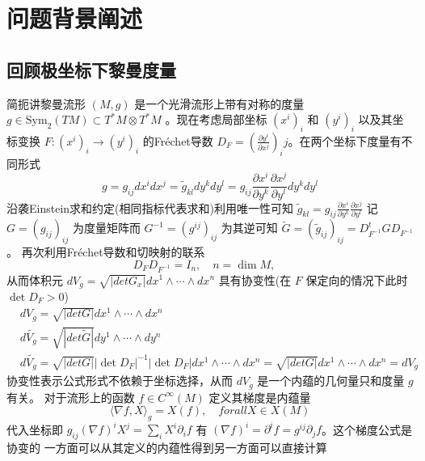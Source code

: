 \section{问题背景阐述}

\subsection{回顾极坐标下黎曼度量}

简扼讲黎曼流形 $(M,g)$ 是一个光滑流形上带有对称的度量 $g \in \mathrm{Sym}_2(TM) \subset T^*M \otimes T^*M $ 。现在考虑局部坐标 $(x^i)_i$
和 $(y^i)_i$ 以及其坐标变换 $F:(x^i)_i \to (y^i)_i$ 的Fr\'echet导数 $D_F = (\frac{\partial y^i}{\partial x^j})_ij$。在两个坐标下度量有不同形式
\begin{equation*}
    g  = g_{ij} dx^i dx^j = \tilde{g}_{kl}dy^k dy^l = g_{ij}\frac{\partial x^i}{\partial y^k}\frac{\partial x^j}{\partial y^l}d y^k dy^l
\end{equation*}
沿袭Einstein求和约定(相同指标代表求和)利用唯一性可知 $\tilde{g}_{kl} = g_{ij}\frac{\partial x^i}{\partial y^k}\frac{\partial x^j}{\partial y^l}$
记 $G = (g_{ij})_{ij}$ 为度量矩阵而 $G^{-1} = (g^{ij})_{ij}$ 为其逆可知 $\tilde{G} = (\tilde{g}_{ij})_{ij} = D_{F^{-1}}^{t}G D_{F^{-1}}$。
再次利用Fr\'echet导数和切映射的联系
\begin{equation*}
    D_F D_{F^{-1}} = I_n,\quad n = \dim M, \quad 
\end{equation*} 
从而体积元 $dV_g = \sqrt{|det G_x|} dx^1\wedge\cdots\wedge d x^n $ 具有协变性(在 $F$ 保定向的情况下此时 $\det D_F >0$)
\begin{align*}
    &dV_g = \sqrt{|det G|} dx^1\wedge\cdots\wedge d x^n \tag*{(V1)}\\
    &d\widetilde{V_g} = \sqrt{|det \tilde{G}|} dy^1\wedge\cdots\wedge d y^n\\
    &d\widetilde{V_g}  =  \sqrt{|det G|} |\det D_F|^{-1} |\det D_F| dx^1\wedge\cdots\wedge d x^n  = \sqrt{|det G|} dx^1\wedge\cdots\wedge d x^n = dV_g
\end{align*}
协变性表示公式形式不依赖于坐标选择，从而 $dV_g$ 是一个内蕴的几何量只和度量 $g$ 有关。
对于流形上的函数 $f \in C^\infty(M)$ 定义其梯度是内蕴量
\begin{equation*}
    \langle \nabla f, X \rangle_g = X(f),\quad forall X \in X(M)
\end{equation*}
代入坐标即 $g_{ij}(\nabla f)^i X^j = \sum_i X^i\partial_i f$ 有 $(\nabla f)^i = \partial^i f = g^{ij}\partial_j f$。这个梯度公式是协变的
一方面可以从其定义的内蕴性得到另一方面可以直接计算

